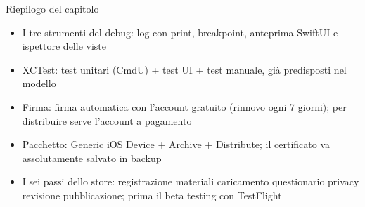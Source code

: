 \begin{tcbsummary}{Riepilogo del capitolo}
\begin{itemize}
  \item I tre strumenti del debug: log con print, breakpoint, anteprima SwiftUI e ispettore delle viste
  \item XCTest: test unitari (CmdU) + test UI + test manuale, già predisposti nel modello
  \item Firma: firma automatica con l'account gratuito (rinnovo ogni 7 giorni); per distribuire serve l'account a pagamento
  \item Pacchetto: Generic iOS Device + Archive + Distribute; il certificato va assolutamente salvato in backup
  \item I sei passi dello store: registrazione materiali caricamento questionario privacy revisione pubblicazione; prima il beta testing con TestFlight
\end{itemize}

\end{tcbsummary}

